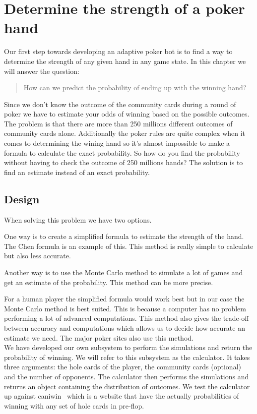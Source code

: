 \section{Determine the strength of a poker hand}
\label{sec:part1}
Our first step towards developing an adaptive poker bot is to find a way to determine the strength of any given hand in any game state. In this chapter we will answer the question: 
\begin{quotation}
How can we predict the probability of ending up with the winning hand?
\end{quotation}

Since we don't know the outcome of the community cards during a round of poker we have to estimate your odds of winning based on the possible outcomes. The problem is that there are more than 250 millions different outcomes of community cards alone. Additionally the poker rules are quite complex when it comes to determining the wining hand so it's almost impossible to make a formula to calculate the exact probability. So how do you find the probability without having to check the outcome of 250 millions hands? 
The solution is to find an estimate instead of an exact probability.

\subsection{Design}
When solving this problem we have two options.

One way is to create a simplified formula to estimate the strength of the hand. The Chen formula is an example of this. This method is really simple to calculate but also less accurate.

Another way is to use the Monte Carlo method to simulate a lot of games and get an estimate of the probability. This  method can be more precise. 

For a human player the simplified formula would work best but in our case the Monte Carlo method is best suited. This is because a computer has no problem performing a lot of advanced computations. This method also gives the trade-off between accuracy and computations which allows us to decide how accurate an estimate we need. The major poker sites also use this method.\\

We have developed our own subsystem to perform the simulations and return the probability of winning. We will refer to this subsystem as the calculator. It takes three arguments: the hole cards of the player, the community cards (optional) and the number of opponents. The calculator then performs the simulations and returns an object containing the distribution of outcomes.
We test the calculator up against caniwin~\cite{caniwin} which is a website that have the actually probabilities of winning with any set of hole cards in pre-flop.


